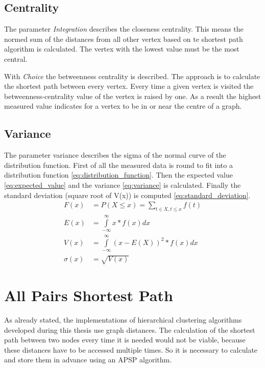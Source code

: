\subsection{Centrality}
The parameter \textit{Integration} describes the closeness centrality. This means the normed sum of the distances from all other vertex based on te shortest path algorithm is calculated. The vertex with the lowest value must be the most central.

With \textit{Choice} the betweenness centrality is described. The approach is to calculate the shortest path between every vertex. Every time a given vertex is visited the betweenness-centrality value of the vertex is raised by one. As a result the highest measured value indicates for a vertex to be in or near the centre of a graph.

\subsection{Variance}
The parameter variance describes the sigma of the normal curve of the distribution function.
First of all the measured data is round to fit into a distribution function \ref{eq:distribution_function}. Then the expected value \ref{eq:expected_value} and the variance \ref{eq:variance} is calculated. Finally the standard deviation (square root of V(x)) is computed \ref{eq:standard_deviation}.
\begin{align}
\label{eq:distribution_function} 
F(x) &= P(X \leq x) =  \sum_{t\in{X}, t\leq{x}}{f(t)} \\
\label{eq:expected_value} 
E(x) &= \int\limits_{-\infty}^\infty x * f(x)dx \\
\label{eq:variance} 
V(x) &= \int\limits_{-\infty}^\infty (x - E(X))^2 * f(x)dx \\
\label{eq:standard_deviation} 
\sigma(x) &= \sqrt{V(x)}
\end{align}

\section{All Pairs Shortest Path} \label{sec:shortest_path}
As already stated, the implementations of hierarchical clustering algorithms developed during this thesis use graph distances. The calculation of the shortest path between two nodes every time it is needed would not be viable, because these distances have to be accessed multiple times. So it is necessary to calculate and store them in advance using an \gls{APSP} algorithm.
